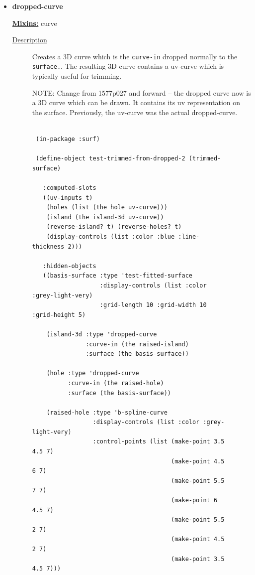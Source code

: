 \documentclass [11pt]{book}
\begin{document}
\begin{itemize}
\item {}
\label{prim:dropped-curve}
\textbf{dropped-curve}


\textbf{
\underline{Mixins:}} curve





\begin{description}

\item [
\underline{Description}]


Creates a 3D curve which is the \texttt{curve-in} dropped normally to the \texttt{surface.}.
The resulting 3D curve contains a uv-curve which is typically useful for trimming.


NOTE: Change from 1577p027 and forward -- the dropped curve now is a 3D curve which 
can be drawn. It contains its uv representation on the surface. Previously, the uv-curve
was the actual dropped-curve.






\end{description}




\begin{figure}
\begin{lrbox}{\boxedverb}
\begin{minipage}{\linewidth}
{\small

\begin{verbatim}
                  
 (in-package :surf)

 (define-object test-trimmed-from-dropped-2 (trimmed-surface)

   :computed-slots
   ((uv-inputs t)
    (holes (list (the hole uv-curve)))
    (island (the island-3d uv-curve))
    (reverse-island? t) (reverse-holes? t)
    (display-controls (list :color :blue :line-thickness 2)))
  
   :hidden-objects
   ((basis-surface :type 'test-fitted-surface
                   :display-controls (list :color :grey-light-very)
                   :grid-length 10 :grid-width 10 :grid-height 5)
   
    (island-3d :type 'dropped-curve
               :curve-in (the raised-island)
               :surface (the basis-surface))
   
    (hole :type 'dropped-curve
          :curve-in (the raised-hole)
          :surface (the basis-surface))
   
    (raised-hole :type 'b-spline-curve
                 :display-controls (list :color :grey-light-very)
                 :control-points (list (make-point 3.5 4.5 7) 
                                       (make-point 4.5 6 7) 
                                       (make-point 5.5 7 7) 
                                       (make-point 6 4.5 7) 
                                       (make-point 5.5 2 7) 
                                       (make-point 4.5 2 7) 
                                       (make-point 3.5 4.5 7)))
    

\end{verbatim}}
\end{minipage}
\end{lrbox}
\end{figure}
\end{itemize}
\end{document}
